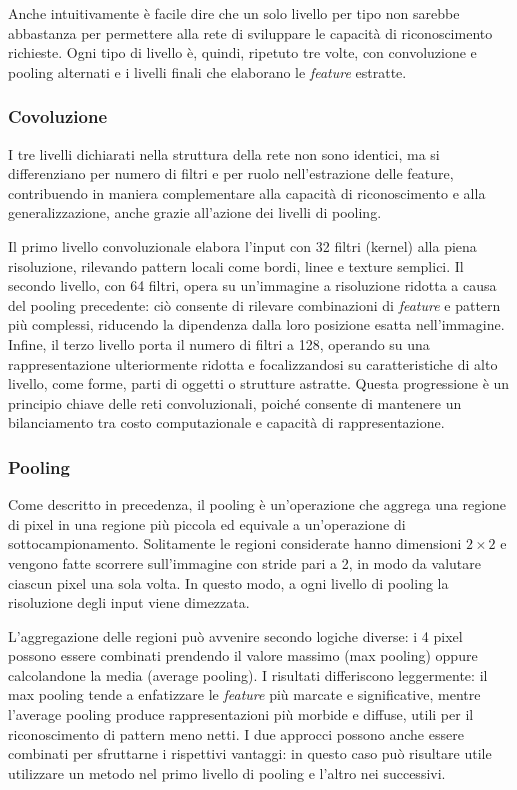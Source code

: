 \documentclass[a4paper,12pt]{article}
\begin{document}
Anche intuitivamente è facile dire che un solo livello per tipo non sarebbe abbastanza per permettere alla rete di sviluppare le capacità di riconoscimento richieste. Ogni tipo di livello è, quindi, ripetuto tre volte, con convoluzione e pooling alternati e i livelli finali che elaborano le \textit{feature} estratte.

\subsubsection{Covoluzione}
I tre livelli dichiarati nella struttura della rete non sono identici, ma si differenziano per numero di filtri e per ruolo nell'estrazione delle feature, contribuendo in maniera complementare alla capacità di riconoscimento e alla generalizzazione, anche grazie all'azione dei livelli di pooling.

Il primo livello convoluzionale elabora l'input con 32 filtri (kernel) alla piena risoluzione, rilevando pattern locali come bordi, linee e texture semplici.
Il secondo livello, con 64 filtri, opera su un'immagine a risoluzione ridotta a causa del pooling precedente: ciò consente di rilevare combinazioni di \textit{feature} e pattern più complessi, riducendo la dipendenza dalla loro posizione esatta nell'immagine.
Infine, il terzo livello porta il numero di filtri a 128, operando su una rappresentazione ulteriormente ridotta e focalizzandosi su caratteristiche di alto livello, come forme, parti di oggetti o strutture astratte.
Questa progressione è un principio chiave delle reti convoluzionali, poiché consente di mantenere un bilanciamento tra costo computazionale e capacità di rappresentazione.

\subsubsection{Pooling}
Come descritto in precedenza, il pooling è un'operazione che aggrega una regione di pixel in una regione più piccola ed equivale a un'operazione di sottocampionamento. Solitamente le regioni considerate hanno dimensioni $2 \times 2$ e vengono fatte scorrere sull'immagine con stride pari a 2, in modo da valutare ciascun pixel una sola volta. In questo modo, a ogni livello di pooling la risoluzione degli input viene dimezzata.

L'aggregazione delle regioni può avvenire secondo logiche diverse: i 4 pixel possono essere combinati prendendo il valore massimo (max pooling) oppure calcolandone la media (average pooling). I risultati differiscono leggermente: il max pooling tende a enfatizzare le \textit{feature} più marcate e significative, mentre l'average pooling produce rappresentazioni più morbide e diffuse, utili per il riconoscimento di pattern meno netti.
I due approcci possono anche essere combinati per sfruttarne i rispettivi vantaggi: in questo caso può risultare utile utilizzare un metodo nel primo livello di pooling e l'altro nei successivi.
\end{document}
